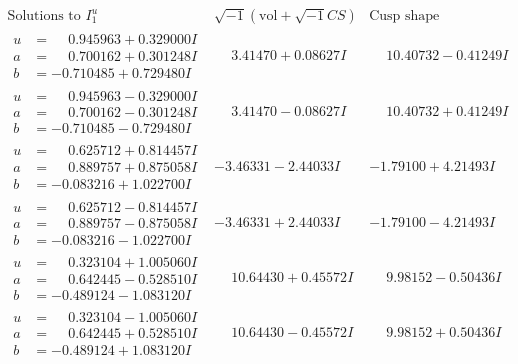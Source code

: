 \documentclass[1p]{elsarticle_modified}
\theoremstyle{definition}
\newcommand{\I}{\sqrt{-1}}
\begin{document}
$$\begin{array}{c|c|c}  
\text{Solutions to }I^u_{1}& \I (\text{vol} + \sqrt{-1}CS) & \text{Cusp shape}\\
 \hline 
\begin{aligned}
u &= \phantom{-}0.945963 + 0.329000 I \\
a &= \phantom{-}0.700162 + 0.301248 I \\
b &= -0.710485 + 0.729480 I\end{aligned}
 & \phantom{-}3.41470 + 0.08627 I & \phantom{-}10.40732 - 0.41249 I \\ \hline\begin{aligned}
u &= \phantom{-}0.945963 - 0.329000 I \\
a &= \phantom{-}0.700162 - 0.301248 I \\
b &= -0.710485 - 0.729480 I\end{aligned}
 & \phantom{-}3.41470 - 0.08627 I & \phantom{-}10.40732 + 0.41249 I \\ \hline\begin{aligned}
u &= \phantom{-}0.625712 + 0.814457 I \\
a &= \phantom{-}0.889757 + 0.875058 I \\
b &= -0.083216 + 1.022700 I\end{aligned}
 & -3.46331 - 2.44033 I & -1.79100 + 4.21493 I \\ \hline\begin{aligned}
u &= \phantom{-}0.625712 - 0.814457 I \\
a &= \phantom{-}0.889757 - 0.875058 I \\
b &= -0.083216 - 1.022700 I\end{aligned}
 & -3.46331 + 2.44033 I & -1.79100 - 4.21493 I \\ \hline\begin{aligned}
u &= \phantom{-}0.323104 + 1.005060 I \\
a &= \phantom{-}0.642445 - 0.528510 I \\
b &= -0.489124 - 1.083120 I\end{aligned}
 & \phantom{-}10.64430 + 0.45572 I & \phantom{-}9.98152 - 0.50436 I \\ \hline\begin{aligned}
u &= \phantom{-}0.323104 - 1.005060 I \\
a &= \phantom{-}0.642445 + 0.528510 I \\
b &= -0.489124 + 1.083120 I\end{aligned}
 & \phantom{-}10.64430 - 0.45572 I & \phantom{-}9.98152 + 0.50436 I \\ \hline\begin{aligned}

\end{aligned}
\end{array}$$
\end{document}
